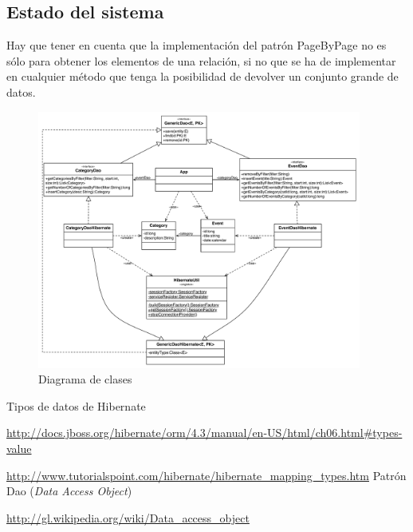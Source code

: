 \documentclass{article}
\begin{document}
\subsection{Estado del sistema}
	Hay que tener en cuenta que la implementación del patrón PageByPage no es sólo para obtener los elementos de una relación, si no que se ha de implementar en cualquier método que tenga la posibilidad de devolver un conjunto grande de datos.
	
\begin{figure}[h]
  \centering
    \includegraphics[width=0.95\textwidth]{commit06/img/UmlClass.pdf}
  \caption{Diagrama de clases}
  \label{fig:c05:UmlClass}
\end{figure}	

\clearpage
\newpage
{\setlength{\parskip}{0mm}\listoffigures}

\clearpage

\renewcommand{\bibname}{Referencias}
\begin{thebibliography}{99}
Tipos de datos de Hibernate

\url{http://docs.jboss.org/hibernate/orm/4.3/manual/en-US/html/ch06.html\#types-value}

\url{http://www.tutorialspoint.com/hibernate/hibernate\_mapping\_types.htm}
Patrón Dao (\textit{Data Access Object})

\url{http://gl.wikipedia.org/wiki/Data_access_object}
\end{thebibliography}
\end{document}
